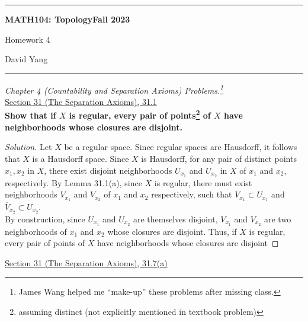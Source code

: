 \documentclass[11pt]{article}
\newenvironment{solution}
  {\renewcommand\qedsymbol{$\blacksquare$}\begin{proof}[Solution]}
  {\end{proof}}
\begin{document}
	\hrule
	\begin{center}
        \textbf{MATH104: Topology}\hfill \textbf{Fall 2023}\newline

		{\Large Homework 4}

		David Yang
	\end{center}

\hrule

\vspace{1em}

\textit{Chapter 4 (Countability and Separation Axioms) Problems.\footnote{James Wang helped me ``make-up'' these problems after missing class.}} \\

\underline{Section 31 (The Separation Axioms), 31.1} \\

\textbf{Show that if $X$ is regular, every pair of points\footnote{assuming distinct (not explicitly mentioned in textbook problem)} of $X$ have neighborhoods whose closures are disjoint.}

\begin{solution}
Let $X$ be a regular space. Since regular spaces are Hausdorff, it follows that $X$ is a Hausdorff space. Since $X$ is Hausdorff, for any pair of distinct points $x_1, x_2$ in $X$,
there exist disjoint neighborhoods $U_{x_1}$ and $U_{x_2}$ in $X$ of $x_1$ and $x_2$, respectively. By Lemma 31.1(a), since $X$ is regular, there must exist neighborhoods $V_{x_1}$ and $V_{x_2}$ of
$x_1$ and $x_2$ respectively, such that $\overline{V}_{x_1} \subset U_{x_1}$ and $\overline{V}_{x_2} \subset U_{x_2}$. \\

By construction, since $U_{x_1}$ and $U_{x_2}$ are themselves disjoint, $V_{x_1}$ and $V_{x_2}$ are two neighborhoods of $x_1$ and $x_2$ whose closures are disjoint. Thus, if $X$ is regular, every pair of points of $X$ have neighborhoods whose closures are disjoint
\end{solution}

\newpage

\underline{Section 31 (The Separation Axioms), 31.7(a)} \\
\end{document}
